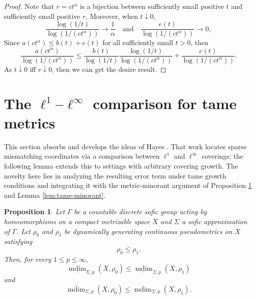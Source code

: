 \documentclass[12pt]{amsart}
\newtheorem{proposition}[theorem]{Proposition}
\theoremstyle{definition}
\theoremstyle{remark}
\newcommand{\mdim}{\operatorname{mdim}}
\begin{document}
\begin{proof}
Note that $r=ct^\alpha$ is a bijection between sufficiently small positive $t$ and sufficiently small positive $r$. Moreover, when $t\downarrow0$,
\[
 \frac{\log(1/t)}{\log(1/(ct^\alpha))}\longrightarrow\frac1\alpha
 \quad\text{and}\quad
 \frac{e(t)}{\log(1/(ct^\alpha))}\longrightarrow0,
\]
Since $ a(ct^\alpha)\leq b(t)+e(t)$ for all sufficiently small $t>0$,
    then
    \[
        \frac{a(ct^{\alpha})}{\log(1/(ct^{\alpha}))}\leq \frac{b(t)}{\log(1/t)} \frac{\log(1/t)}{\log(1/(ct^\alpha))}+ \frac{e(t)}{\log(1/(ct^\alpha))}.
    \]
As $t\downarrow0 $  iff $r\downarrow0$, then we can get the desire result.
\end{proof}





\section{The \texorpdfstring{$\ell^1$--$\ell^\infty$}{l1--linfinity} comparison for tame metrics}\label{sec:l1linfty}
This section absorbs and develops the ideas of Hayes \cite[Proposition 2.20]{Hayes}. That work locates sparse mismatching coordinates via a comparison between $\ell^1$ and $\ell^\infty$ coverings; the following lemma extends this to settings with arbitrary covering growth. The novelty here lies in analyzing the resulting error term under tame growth conditions and integrating it with the metric-minorant argument of Proposition \ref{prop:monotone} and Lemma \ref{lem:tame-minorant}.

\begin{proposition}\label{prop:monotone}
Let $\Gamma$ be a countable discrete sofic group acting by homeomorphisms on a compact metrizable
space $X$ and $\Sigma$ a sofic approximation of $\Gamma$.
Let $\rho_0$ and $\rho_1$ be dynamically generating continuous pseudometrics on $X$ satisfying
\[
 \rho_0\leq \rho_1.
\]
Then, for every $1\leq p\leq\infty$,
\[
 \underline{\mdim}_{\Sigma,p}(X,\rho_0)
 \leq \underline{\mdim}_{\Sigma,p}(X,\rho_1)
\]
and
\[
 \overline{\mdim}_{\Sigma,p}(X,\rho_0)
 \leq \overline{\mdim}_{\Sigma,p}(X,\rho_1).
\]
\end{proposition}
\end{document}
